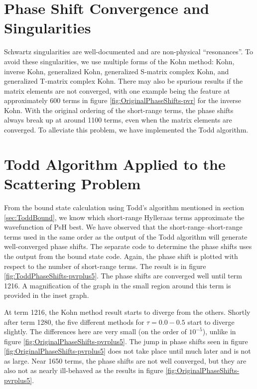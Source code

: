 \documentclass[Dissertation.tex]{subfiles}
\begin{document}
\section{Phase Shift Convergence and Singularities}
Schwartz singularities are well-documented \cite{Lucchese1989,Cooper2009} and are non-physical ``resonances''. To avoid these singularities, we use multiple forms of the Kohn method: Kohn, inverse Kohn, generalized Kohn, generalized S-matrix complex Kohn, and generalized T-matrix complex Kohn. There may also be spurious results if the matrix elements are not converged, with one example being the feature at approximately 600 terms in figure \ref{fig:OriginalPhaseShifts-pvr} for the inverse Kohn. With the original ordering of the short-range terms, the phase shifts always break up at around 1100 terms, even when the matrix elements are converged. To alleviate this problem, we have implemented the Todd algorithm.

\section{Todd Algorithm Applied to the Scattering Problem}
\label{sec:ToddScattering}
From the bound state calculation using Todd's algorithm mentioned in section \ref{sec:ToddBound}, we know which short-range Hylleraas terms approximate the wavefunction of PsH best. We have observed that the short-range--short-range terms used in the same order as the output of the Todd algorithm will generate well-converged phase shifts. The separate code to determine the phase shifts uses the output from the bound state code. Again, the phase shift is plotted with respect to the number of short-range terms. The result is in figure \ref{fig:ToddPhaseShifts-pvrplus5}. The phase shifts are converged well until term 1216. A magnification of the graph in the small region around this term is provided in the inset graph.

At term 1216, the Kohn method result starts to diverge from the others. Shortly after term 1280, the five different methods for $\tau = 0.0 - 0.5$ start to diverge slightly. The differences here are very small (on the order of $10^{-5}$), unlike in figure \ref{fig:OriginalPhaseShifts-pvrplus5}. The jump in phase shifts seen in figure \ref{fig:OriginalPhaseShifts-pvrplus5} does not take place until much later and is not as large. Near 1650 terms, the phase shifts are not well converged, but they are also not as nearly ill-behaved as the results in figure \ref{fig:OriginalPhaseShifts-pvrplus5}.
\end{document}
